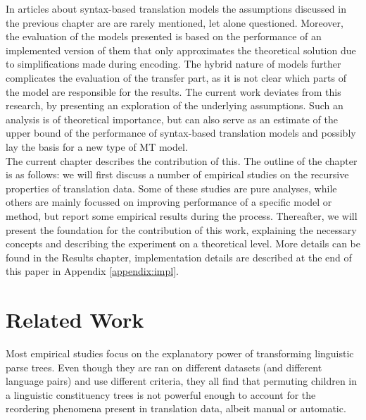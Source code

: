 \documentclass{report}
\theoremstyle{definition}
\theoremstyle{plain}
\begin{document}
In articles about syntax-based translation models the assumptions discussed in the previous chapter are are rarely mentioned, let alone questioned. Moreover, the evaluation of the models presented is based on the performance of an implemented version of them that only approximates the theoretical solution due to simplifications made during encoding. The hybrid nature of models further complicates the evaluation of the transfer part, as it is not clear which parts of the model are responsible for the results. The current work deviates from this research, by presenting an exploration of the underlying assumptions. Such an analysis is of theoretical importance, but can also serve as an estimate of the upper bound of the performance of syntax-based translation models and possibly lay the basis for a new type of MT model.\\
The current chapter describes the contribution of this. The outline of the chapter is as follows: we will first discuss a number of empirical studies on the recursive properties of translation data. Some of these studies are pure analyses, while others are mainly focussed on improving performance of a specific model or method, but report some empirical results during the process. Thereafter, we will present the foundation for the contribution of this work, explaining the necessary concepts and describing the experiment on a theoretical level. More details can be found in the Results chapter, implementation details are described at the end of this paper in Appendix \ref{appendix:impl}.

\section{Related Work}

Most empirical studies focus on the explanatory power of transforming linguistic parse trees. Even though they are ran on different datasets (and different language pairs) and use different criteria, they all find that permuting children in a linguistic constituency trees is not powerful enough to account for the reordering phenomena present in translation data, albeit manual or automatic.
\end{document}
